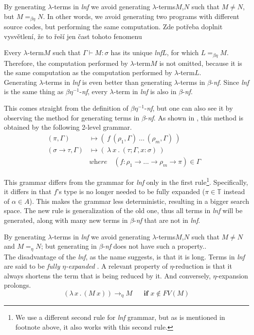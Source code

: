\documentclass{sig-alternate}
\newcommand{\lterm}{$\lambda$-term\xspace}
\newcommand{\lterms}{$\lambda$-terms\xspace}
\newcommand{\turst}[3]{$#1\vdash{}#2:#3$\xspace}
\newcommand{\GMS}{\turst{\Gamma}{M}{\sigma}}
\newcommand{\lamb}[2]{( \lambda \, #1 \, . \, #2 )}
\newcommand{\bnf}{$\beta$-\textit{nf}\xspace}
\newcommand{\beenf}{$\beta\eta^{-1}$-\textit{nf}\xspace}
\newcommand{\lnf}{\textit{lnf}\xspace}
\newcommand{\ar}{\rightarrow\xspace}
\newcommand{\T}{\mathbb{T}\xspace}
\newcommand{\gar}{\longmapsto}
\newcommand{\eArrow}{\rightarrow_\eta\xspace}
\newcommand{\red}[1]{{\color{red} #1}}
\begin{document}
By generating \lterms in \textit{lnf} we avoid generating 
\lterms $M$,$N$ such that $M \not= N$, but $M =_{\beta\eta} N$.
In other words, we avoid generating two programs with different 
source codes, but performing the same computation.
\red{Zde potřeba doplnit vysvětlení, že to řeší jen čast tohoto
fenomenu}


Every \lterm $M$ such that \GMS has its unique \lnf $L$, 
for which $L =_{\beta\eta} M$.
Therefore, the computation performed by \lterm $M$ 
is not omitted, because it is the same computation
as the computation performed by \lterm $L$. \\

Generating \lterms in \lnf is even better than generating 
\lterms in \bnf. Since \lnf is the same thing as \beenf,
every \lterm in \lnf is also in \bnf. 

This comes straight from the definition of \beenf, 
but one can also see it by observing the method for generating
terms in \bnf. As shown in \cite{barendregt10}, 
this method is obtained by the following 2-level grammar.
\begin{align*}
( \pi , \Gamma )  
&\gar
(~f~( \rho_1 , \Gamma )~\dots~( \rho_m , \Gamma )~)
\\ 
( \sigma \rightarrow \tau , \Gamma )  
&\gar
(~\lambda~x~.~( \tau ; \Gamma,x:\sigma )~)
&   
\\& \textit{where~~~} (f : \rho_1 \ar \dots \ar \rho_m \ar \pi) \in \Gamma
\end{align*}

This grammar differs from the grammar for \lnf only in the first rule\footnote{We use a different second rule for \lnf grammar, but as is mentioned in footnote above, it also works with this second rule.}. Specifically, it differs in that $f$'s type is no longer needed to be fully expanded ($\pi \in \T$ instead of $\alpha \in A$). This makes the grammar less deterministic,
resulting in a bigger search space. The new rule is generalization of the old one,
thus all terms in \lnf will be generated, along with many new terms in \bnf that 
are not in \lnf. 
    
By generating \lterms in \lnf we avoid generating 
\lterms $M$,$N$ such that $M \not= N$ and $M =_{\eta} N$; 
but generating in \bnf does not have such a property..\\


The disadvantage of the \lnf, as the name suggests, is that it is long.
Terms in \lnf are said to be \textit{fully $\eta$-expanded} \cite{barendregt10}. 
A relevant property of $\eta$-reduction is that it always shortens the term
that is being reduced by it. And conversely, $\eta$-expansion prolongs.
$$\lamb{x}{(M~x)} \eArrow M \textbf{ ~~~~if } x \not\in FV(M) $$
\end{document}
